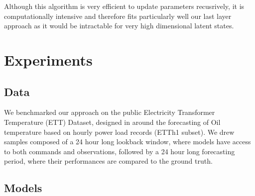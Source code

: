 \documentclass[journal]{IEEEtran}
\begin{document}
Although this algorithm is very efficient to update parameters recusrively, it is computationally intensive and therefore fits particularly well our last layer approach as it would be intractable for very high dimensional latent states.

\section{Experiments}
\label{sec:exp}
\subsection{Data}
\label{sub:data}
We benchmarked our approach on the public Electricity Transformer Temperature (ETT) Dataset, designed in \cite{Zhou2021Informer} around the forecasting of Oil temperature based on hourly power load records (ETTh1 subset).
We drew samples composed of a 24 hour long lookback window, where models have access to both commands and observations, followed by a 24 hour long forecasting period, where their performances are compared to the ground truth.

\subsection{Models}%
\label{sub:models}
\end{document}
